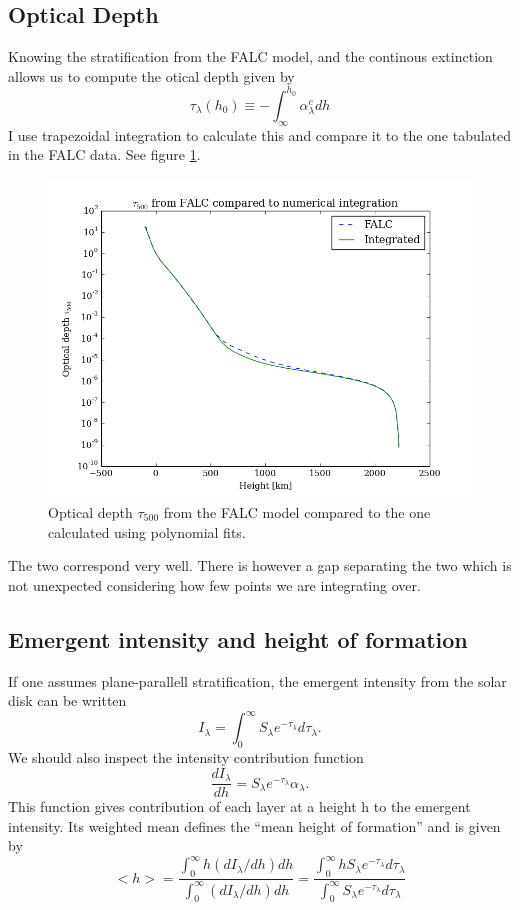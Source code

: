 \documentclass{aa}   %
\begin{document}
\subsection{Optical Depth}
Knowing the stratification from the FALC model, and the continous extinction allows us to compute the otical depth given by 
\begin{equation}
 \tau_\lambda(h_0) \equiv - \int_\infty^{h_0}\alpha_\lambda^c dh
\end{equation}
I use trapezoidal integration to calculate this and compare it to the one tabulated in the FALC data. See figure \ref{optical_depth}.
\begin{figure}
 \includegraphics[width=.49\textwidth]{optical_depth.png}
 \caption{Optical depth $\tau_{500}$ from the FALC model compared to the one calculated using polynomial fits.}
 \label{optical_depth}
\end{figure}
The two correspond very well. There is however a gap separating the two which is not unexpected considering how few points we are integrating over.
\subsection{Emergent intensity and height of formation}
If one assumes plane-parallell stratification, the emergent intensity from the solar disk can be written
\begin{equation}
 I_\lambda = \int_0^\infty S_\lambda e^{-\tau_\lambda}d\tau_\lambda.
\end{equation}
We should also inspect the intensity contribution function
\begin{equation}
 \frac{dI_\lambda}{dh} = S_\lambda e^{-\tau_\lambda}\alpha_\lambda.
\end{equation}
This function gives contribution of each layer at a height h to the emergent intensity. Its weighted mean defines the ``mean height of formation'' and is given by
\begin{equation}
 <h> = \frac{\int_0^\infty h(dI_\lambda/dh)dh}{\int_0^\infty(dI_\lambda/dh)dh} = \frac{\int_0^\infty hS_\lambda e^{-\tau_\lambda}d\tau_\lambda}{\int_0^\infty S_\lambda e^{-\tau_\lambda}d\tau_\lambda}
\end{equation}
\end{document}
